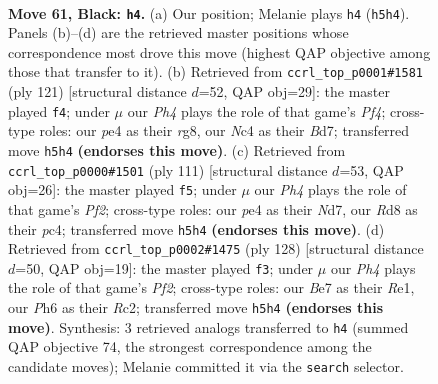 \documentclass[11pt]{article}
\begin{document}
\clearpage

\begin{figure}[p]\centering
\begin{subfigure}{0.46\textwidth}\centering
\resizebox{\linewidth}{!}{%
\newchessgame
\chessboard[
  setfen={3r4/4b3/p2p2kp/4p2p/2n1P3/2B2P2/5KB1/7R b - - 1 61},
  showmover=false,
  pgfstyle=straightmove, color=movearrow, markmove={h5-h4}
]}
\caption{}
\end{subfigure}\hfill
\begin{subfigure}{0.46\textwidth}\centering
\resizebox{\linewidth}{!}{%
\newchessgame
\chessboard[
  setfen={6R1/2kb1r2/1np5/p4p2/P1p5/2P5/2BK4/7R b - - 18 61},
  showmover=false,
  pgfstyle=straightmove, color=movearrow, markmove={f5-f4}
]}
\caption{}
\end{subfigure}
\\[4pt]
\begin{subfigure}{0.46\textwidth}\centering
\resizebox{\linewidth}{!}{%
\newchessgame
\chessboard[
  setfen={6k1/3n1p2/1p1P4/p1p5/2P2R1P/r7/3BK3/8 b - - 5 56},
  showmover=false,
  pgfstyle=straightmove, color=movearrow, markmove={f7-f5}
]}
\caption{}
\end{subfigure}\hfill
\begin{subfigure}{0.46\textwidth}\centering
\resizebox{\linewidth}{!}{%
\newchessgame
\chessboard[
  setfen={8/1r2bpk1/4b1p1/7p/4N2P/6P1/2R2PK1/4R3 w - - 15 65},
  showmover=false,
  pgfstyle=straightmove, color=movearrow, markmove={f2-f3}
]}
\caption{}
\end{subfigure}
\caption{\textbf{Move 61, Black: \texttt{h4}.} (a) Our position; Melanie plays \texttt{h4} (\texttt{h5h4}). Panels (b)--(d) are the retrieved master positions whose correspondence most drove this move (highest QAP objective among those that transfer to it). (b) Retrieved from \texttt{ccrl\_top\_p0001\#1581} (ply 121) [structural distance $d$=52, QAP obj=29]: the master played \texttt{f4}; under $\mu$ our \emph{Ph4} plays the role of that game's \emph{Pf4}; cross-type roles: our \emph{p}e4 as their \emph{r}g8, our \emph{N}c4 as their \emph{B}d7; transferred move \texttt{h5h4} \textbf{(endorses this move)}. (c) Retrieved from \texttt{ccrl\_top\_p0000\#1501} (ply 111) [structural distance $d$=53, QAP obj=26]: the master played \texttt{f5}; under $\mu$ our \emph{Ph4} plays the role of that game's \emph{Pf2}; cross-type roles: our \emph{p}e4 as their \emph{N}d7, our \emph{R}d8 as their \emph{p}c4; transferred move \texttt{h5h4} \textbf{(endorses this move)}. (d) Retrieved from \texttt{ccrl\_top\_p0002\#1475} (ply 128) [structural distance $d$=50, QAP obj=19]: the master played \texttt{f3}; under $\mu$ our \emph{Ph4} plays the role of that game's \emph{Pf2}; cross-type roles: our \emph{B}e7 as their \emph{R}e1, our \emph{P}h6 as their \emph{R}c2; transferred move \texttt{h5h4} \textbf{(endorses this move)}. Synthesis: 3 retrieved analogs transferred to \texttt{h4} (summed QAP objective 74, the strongest correspondence among the candidate moves); Melanie committed it via the \texttt{search} selector.}
\label{fig:thought-m121}
\end{figure}
\end{document}
